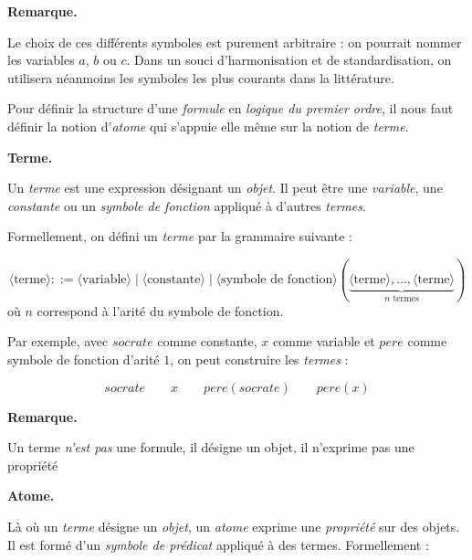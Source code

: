 \documentclass[11pt]{article}
\newenvironment{remarque}{%
    \begin{mdframed}[
        linecolor=sectioncolor!40,
        linewidth=0.8pt,
        backgroundcolor=sectioncolor!5,
        innerleftmargin=10pt,
        innerrightmargin=10pt,
        innertopmargin=6pt,
        innerbottommargin=6pt,
        skipabove=8pt,
        skipbelow=8pt
    ]
    \noindent\textbf{\small\color{sectioncolor}Remarque.}\enspace\small\itshape
}{%
    \end{mdframed}
}
\begin{document}
\begin{remarque}
    Le choix de ces différents symboles est purement arbitraire : on pourrait nommer les variables $a$, $b$ ou $c$. Dans un souci d'harmonisation et de standardisation, on utilisera néanmoins les symboles les plus courants dans la littérature.
\end{remarque}
\vspace{0.2cm}

Pour définir la structure d'une \textit{formule} en \textit{logique du premier ordre}, il nous faut définir la notion d'\textit{atome} qui s'appuie elle même sur la notion de \textit{terme}.

\vspace{0.4cm}
\noindent\textbf{Terme.}
\vspace{0.2cm}

Un \textit{terme} est une expression désignant un \textit{objet}. Il peut être une \textit{variable}, une \textit{constante} ou un \textit{symbole de fonction} appliqué à d'autres \textit{termes}. 

Formellement, on défini un \textit{terme} par la grammaire suivante :

\[
\langle\text{terme}\rangle ::= \langle\text{variable}\rangle \mid
\langle\text{constante}\rangle \mid
\langle\text{symbole de fonction}\rangle(\underbrace{\langle\text{terme}\rangle, \ldots,
\langle\text{terme}\rangle}_{n \text{ termes}})
\]
\noindent où $n$ correspond à l'arité du symbole de fonction.
\vspace{0.2cm}

Par exemple, avec $\mathit{socrate}$ comme constante, $x$ comme variable et 
$\mathit{pere}$ comme symbole de fonction d'arité $1$, on peut construire les \textit{termes} :

$$
\mathit{socrate} \qquad x \qquad \mathit{pere}(\mathit{socrate}) \qquad 
\mathit{pere}(x)
$$

\begin{remarque}
    Un terme \emph{n'est pas} une formule, il désigne un objet, il n'exprime pas une propriété
\end{remarque}

\vspace{0.4cm}
\noindent\textbf{Atome.}
\vspace{0.2cm}

Là où un \textit{terme} désigne un \textit{objet}, un \textit{atome} exprime 
une \textit{propriété} sur des objets. Il est formé d'un \textit{symbole de prédicat} appliqué à des termes. Formellement :
\end{document}
